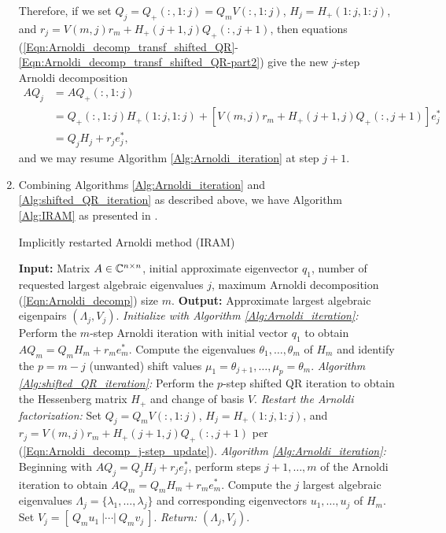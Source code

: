 \begin{enumerate}
Therefore, if we set $Q_j = Q_+(:, 1:j) = Q_mV(:, 1:j)$, $H_j = H_+(1:j, 1:j)$, and $r_j = V(m,j)r_m + H_+(j+1,j)Q_+(:,j+1)$, then equations (\ref{Eqn:Arnoldi_decomp_transf_shifted_QR}-\ref{Eqn:Arnoldi_decomp_transf_shifted_QR-part2}) give the new $j$-step Arnoldi decomposition
\begin{equation}		\label{Eqn:Arnoldi_decomp_j-step_update}
\begin{split}
AQ_j  
	&	= AQ_+(:, 1:j) 	\\
	& = Q_+(:, 1:j)H_+(1:j, 1:j) + \left[V(m,j)r_m + H_+(j+1,j)Q_+(:,j+1) \right] e_j^*		\\
	& = Q_jH_j + r_je_j^*,
\end{split}
\end{equation}
and we may resume Algorithm \ref{Alg:Arnoldi_iteration} at step $j+1$.




\item

Combining Algorithms \ref{Alg:Arnoldi_iteration} and \ref{Alg:shifted_QR_iteration} as described above, we have Algorithm \ref{Alg:IRAM} as presented in \cite[Section 10.5.3]{golub2012matrix}.

\begin{algorithm}[H]
\caption{Implicitly restarted Arnoldi method (IRAM)}	\label{Alg:IRAM}

\begin{algorithmic}[1]
	\Statex 	\textbf{Input:} Matrix $A \in {\mathbb C}^{n \times n}$, initial approximate eigenvector $q_1$, number of requested largest algebraic eigenvalues $j$, maximum Arnoldi decomposition (\ref{Eqn:Arnoldi_decomp}) size $m$.
	\Statex 	\textbf{Output:} Approximate largest algebraic eigenpairs $(\Lambda_j, V_j)$.
	\State		\textit{Initialize with Algorithm \ref{Alg:Arnoldi_iteration}:} Perform the $m$-step Arnoldi iteration with initial vector $q_1$ to obtain $AQ_m = Q_m H_m + r_m e_m^*$.
		\State		Compute the eigenvalues $\theta_1, \ldots , \theta_m$ of $H_m$ and identify the $p = m-j$ (unwanted) shift values $\mu_1 = \theta_{j+1},  \ldots, \mu_p = \theta_m$.
		\State		\textit{Algorithm \ref{Alg:shifted_QR_iteration}:}  Perform the $p$-step shifted QR iteration to obtain the Hessenberg matrix $H_+$ and change of basis $V$.
		\State		\textit{Restart the Arnoldi factorization:} Set 
		$Q_j = Q_mV(:, 1:j)$,
		$H_j = H_+(1:j, 1:j)$,
		and $r_j = V(m,j)r_m + H_+(j+1,j)Q_+(:,j+1)$ per (\ref{Eqn:Arnoldi_decomp_j-step_update}).
		\State		\textit{Algorithm \ref{Alg:Arnoldi_iteration}:}  Beginning with $AQ_j = Q_jH_j + r_je_j^*$, perform steps $j+1, \ldots, m$ of the Arnoldi iteration to obtain $AQ_m = Q_m H_m + r_m e_m^*$.
	\EndWhile
	\State 		Compute the $j$ largest algebraic eigenvalues $\Lambda_j = \{ \lambda_1, \ldots, \lambda_j\}$ and corresponding eigenvectors $u_1, \ldots, u_j$ of $H_m$.  Set $V_j = [ \ Q_m u_1 \ | \cdots | \ Q_m v_j \ ]$.
	\State		\textit{Return:} $(\Lambda_j, V_j)$.
\end{algorithmic}


\end{algorithm}
\end{enumerate}
